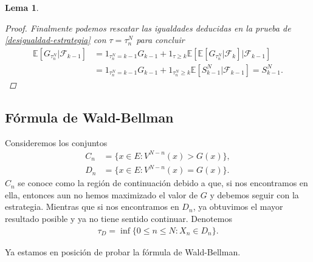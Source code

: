 \documentclass{article}
\newtheorem{lema}[theorem]{Lema}
\numberwithin{equation}{section}
\begin{document}
\begin{lema}
\begin{proof}
Finalmente podemos rescatar las igualdades deducidas en la prueba de \eqref{desigualdad-estrategia} con $\tau = \tau_n^N$ para concluir
\begin{align*}
    \mathbb{E}\left[G_{\tau_n^N} | \mathcal{F}_{k-1}\right] &= 1_{\tau_n^N = k-1}G_{k-1} + 1_{\tau\geq k}\mathbb{E}\left[\mathbb{E}\left[G_{\tau_n^N} | \mathcal{F}_{k} \right] | \mathcal{F}_{k-1}  \right]\\
    &= 1_{\tau_n^N = k-1}G_{k-1} + 1_{\tau_n^N\geq k}\mathbb{E}\left[S^N_{k-1} | \mathcal{F}_{k-1}  \right] = S_{k-1}^N.
\end{align*}


\end{proof}

\end{lema}


\subsection{Fórmula de Wald-Bellman}

 Consideremos los conjuntos
\begin{align}
    C_n &= \{x \in E : V^{N-n}(x) > G(x)\},\\
    D_n &= \{x \in E : V^{N-n}(x) = G(x)\}.
\end{align}
$C_n$ se conoce como la región de continuación debido a que, si nos encontramos en ella, entonces aun no hemos maximizado el valor de $G$ y debemos seguir con la estrategia. Mientras que si nos encontramos en $D_n$, ya obtuvimos el mayor resultado posible y ya no tiene sentido continuar.  Denotemos 
\begin{align*}
\tau_D = \inf\{0\leq n \leq N : X_n \in D_n\}.
\end{align*}


Ya estamos en posición de probar la fórmula de Wald-Bellman.
\end{document}
